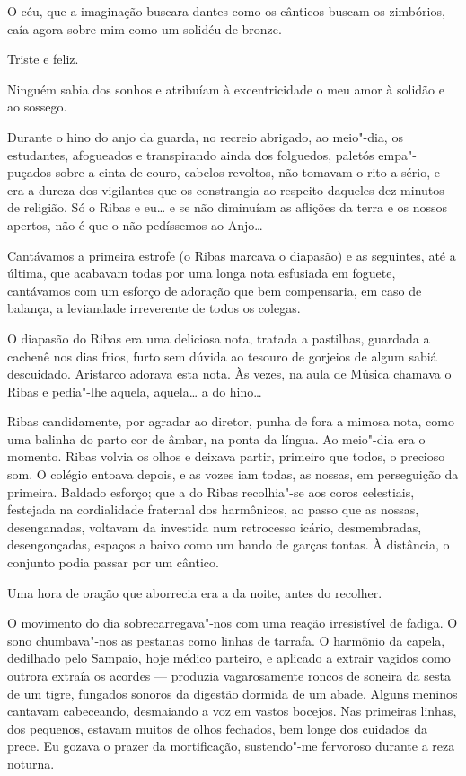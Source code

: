 O céu, que a imaginação buscara dantes como os cânticos
buscam os zimbórios, caía agora sobre mim como um solidéu de bronze.

Triste e feliz. 

Ninguém sabia dos sonhos e atribuíam à excentricidade o
meu amor à solidão e ao sossego. 

Durante o hino do anjo da guarda, no
recreio abrigado, ao meio"-dia, os estudantes, afogueados e
transpirando ainda dos folguedos, paletós empa"-puçados sobre a cinta
de couro, cabelos revoltos, não tomavam o rito a sério, e era a dureza
dos vigilantes que os constrangia ao respeito daqueles dez minutos de
religião. Só o Ribas e eu\ldots{} e se não diminuíam as aflições da terra e
os nossos apertos, não é que o não pedíssemos ao Anjo\ldots{} 

Cantávamos a
primeira estrofe (o Ribas marcava o diapasão) e as seguintes, até a
última, que acabavam todas por uma longa nota esfusiada em foguete,
cantávamos com um esforço de adoração que bem compensaria, em caso de
balança, a leviandade irreverente de todos os colegas. 

O diapasão do Ribas era uma deliciosa nota, tratada a pastilhas, guardada a
cachenê nos dias frios, furto sem dúvida ao tesouro de gorjeios de
algum sabiá descuidado. Aristarco adorava esta nota. Às vezes, na aula
de Música chamava o Ribas e pedia"-lhe aquela, aquela\ldots{} a do hino\ldots{}

Ribas candidamente, por agradar ao diretor, punha de fora a mimosa
nota, como uma balinha do parto cor de âmbar, na ponta da língua. Ao
meio"-dia era o momento. Ribas volvia os olhos e deixava partir,
primeiro que todos, o precioso som. O colégio entoava depois, e as
vozes iam todas, as nossas, em perseguição da primeira. Baldado
esforço; que a do Ribas recolhia"-se aos coros celestiais, festejada
na cordialidade fraternal dos harmônicos, ao passo que as nossas,
desenganadas, voltavam da investida num retrocesso icário,
desmembradas, desengonçadas, espaços a baixo como um bando de garças
tontas. À distância, o conjunto podia passar por um cântico. 

Uma hora de oração que aborrecia era a da noite, antes do recolher. 

O movimento do dia sobrecarregava"-nos com uma reação irresistível de fadiga. 
O sono chumbava"-nos as pestanas como linhas de tarrafa. O harmônio da
capela, dedilhado pelo Sampaio, hoje médico parteiro, e aplicado a
extrair vagidos como outrora extraía os acordes --- produzia
vagarosamente roncos de soneira da sesta de um tigre, fungados sonoros
da digestão dormida de um abade. Alguns meninos cantavam cabeceando,
desmaiando a voz em vastos bocejos. Nas primeiras linhas, dos pequenos,
estavam muitos de olhos fechados, bem longe dos cuidados da prece. Eu
gozava o prazer da mortificação, sustendo"-me fervoroso durante a reza
noturna. 

